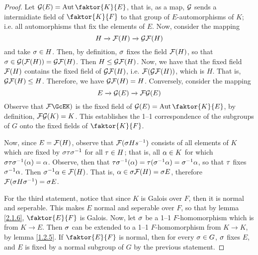 \begin{proof}
    Let $\Gc(E)=\Aut{\faktor{K}{E}}$, that is, as a map, $\mathcal{G}$ sends a
    intermidiate field of  $\faktor{K}{F}$ to that group of $E$-automorphisms of
    $K$; i.e. all automorphisms that fix the elements of $E$. Now, consider the
    mapping
    \begin{equation*}
        H \xrightarrow{} \mathcal{F}(H) \xrightarrow{} \mathcal{G}\mathcal{F}(H)
    \end{equation*}
    and take $\sigma \in H$. Then, by definition, $\sigma$ fixes the field $\mathcal{F}(H)$, so
    that $\sigma \in \mathcal{G}(\mathcal{F}(H))=\mathcal{G}\mathcal{F}(H)$. Then $H \leq \mathcal{G}\mathcal{F}(H)$. Now, we have
    that the fixed field $\mathcal{F}(H)$ contains the fixed field of $\mathcal{G}\mathcal{F}(H)$,
    i.e.  $\mathcal{F}(\mathcal{G}\mathcal{F}(H))$, which is $H$. That is, $\mathcal{G}\mathcal{F}(H) \leq H$.
    Therefore, we have $\mathcal{G}\mathcal{F}(H)=H$. Conversely, consider the mapping
    \begin{equation*}
        E \xrightarrow{} \mathcal{G}(E) \xrightarrow{} \mathcal{F}\mathcal{G}(E)
    \end{equation*}
    Observe that $\Fc\GcEK)$ is the fixed field of $\Gc(E)=\Aut{\faktor{K}{E}}$,
    by definition,  $\mathcal{F}\mathcal{G}(K)=K$. This establishes the 1--1 correspondence of
    the subgroups of $G$ onto the fixed fields of $\faktor{K}{F}$.

    Now, since $E=\mathcal{F}(H)$, observe that $\mathcal{F}(\sigma{H}s^{-1})$ consists of all
    elements of $K$ which are fixed by  $\sigma\tau\sigma^{-1}$ for all $\tau \in H$; that
    is, all $\alpha \in K$ for which  $\sigma\tau\sigma^{-1}(\alpha)=\alpha$. Observe, then that
    $\tau\sigma^{-1}(\alpha)=\tau(\sigma^{-1}{\alpha})=\sigma^{-1}{\alpha}$, so that $\tau$ fixes
    $\sigma^{-1}{\alpha}$. Then $\sigma^{-1}{\alpha} \in \mathcal{F}(H)$. That is, $\alpha \in
    \sigma{\mathcal{F}(H)}=\sigma{E}$, therefore $\mathcal{F}(\sigma{H}\sigma^{-1})=\sigma{E}$.

    For the third statement, notice that since $K$ is Galois over $F$, then it
    is normal and seperable. This makes $E$ normal and seperable over $F$, so
    that by lemma \ref{2.1.6}, $\faktor{E}{F}$ is Galois. Now, let $\sigma$ be a 1--1
    $F$-homomorphism which is from  $K \xrightarrow{} E$. Then $\sigma$ can be
    extended to a 1--1 $F$-homomorphism from $K \xrightarrow{} K$, by lemma
    \ref{1.2.5}. If $\faktor{E}{F}$ is normal, then for every $\sigma \in G$,  $\sigma$
    fixes $E$, and  $E$ is fixed by a normal subgroup of $G$ by the previous
    statement.


\end{proof}
